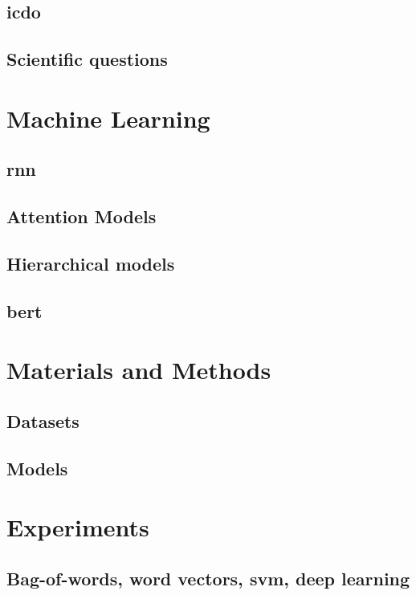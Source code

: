 \subsection{\acs{icdo}}

\subsection{Scientific questions}


\section{Machine Learning}

\subsection{\acs{rnn}}

\subsection{Attention Models}

\subsection{Hierarchical models}

\subsection{\acs{bert}}

\section{Materials and Methods}

\subsection{Datasets}

\subsection{Models}

\section{Experiments}

\subsection{Bag-of-words, word vectors, \acs{svm}, deep learning}

